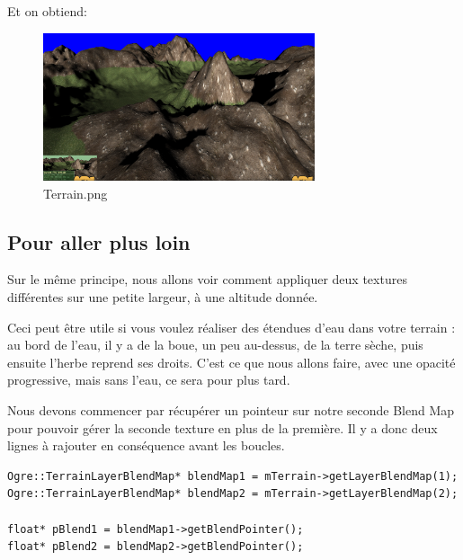 Et on obtiend:
\begin{figure}[hbtp]
\caption{Terrain.png}
\centering
\includegraphics[width=8cm]{Ogre/Base_de_Ogre/Garder_les_pieds_sur_terre/images/Differentes_textures_selon_altitude1.png} %
\end{figure}




















\subsection{Pour aller plus loin}


Sur le m\^eme principe, nous allons voir comment appliquer deux textures diff\'erentes sur une petite largeur, \`a une altitude donn\'ee.

Ceci peut \^etre utile si vous voulez r\'ealiser des \'etendues d'eau dans votre terrain : au bord de l'eau, il y a de la boue, un peu au-dessus, de la terre s\`eche, puis ensuite l'herbe reprend ses droits. C'est ce que nous allons faire, avec une opacit\'e progressive, mais sans l'eau, ce sera pour plus tard.

Nous devons commencer par r\'ecup\'erer un pointeur sur notre seconde Blend Map pour pouvoir g\'erer la seconde texture en plus de la premi\`ere. Il y a donc deux lignes \`a rajouter en cons\'equence avant les boucles.




\begin{lstlisting}[caption={R\'ecup\'eration des Blend Map pour le premier et le second terrain}]
Ogre::TerrainLayerBlendMap* blendMap1 = mTerrain->getLayerBlendMap(1);
Ogre::TerrainLayerBlendMap* blendMap2 = mTerrain->getLayerBlendMap(2);

float* pBlend1 = blendMap1->getBlendPointer();
float* pBlend2 = blendMap2->getBlendPointer();
\end{lstlisting}

